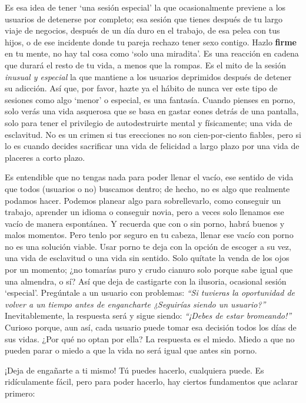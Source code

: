 \documentclass[
]{book}
\begin{document}
Es esa idea de tener `una sesión especial' la que ocasionalmente previene a los usuarios de detenerse por completo; esa sesión que tienes después de tu largo viaje de negocios, después de un día duro en el trabajo, de esa pelea con tus hijos, o de ese incidente donde tu pareja rechazo tener sexo contigo. Hazlo \textbf{firme} en tu mente, no hay tal cosa como `solo una miradita'. Es una reacción en cadena que durará el resto de tu vida, a menos que la rompas. Es el mito de la sesión \emph{inusual y especial} la que mantiene a los usuarios deprimidos después de detener su adicción. Así que, por favor, hazte ya el hábito de nunca ver este tipo de sesiones como algo `menor' o especial, es una fantasía. Cuando pienses en porno, solo verás una vida asquerosa que se basa en gastar eones detrás de una pantalla, solo para tener el privilegio de autodestruirte mental y físicamente; una vida de esclavitud. No es un crimen si tus erecciones no son cien-por-ciento fiables, pero si lo es cuando decides sacrificar una vida de felicidad a largo plazo por una vida de placeres a corto plazo.

Es entendible que no tengas nada para poder llenar el vacío, ese sentido de vida que todos (usuarios o no) buscamos dentro; de hecho, no es algo que realmente podamos hacer. Podemos planear algo para sobrellevarlo, como conseguir un trabajo, aprender un idioma o conseguir novia, pero a veces solo llenamos ese vacío de manera espontánea. Y recuerda que con o sin porno, habrá buenos y malos momentos. Pero tenlo por seguro en tu cabeza, llenar ese vacío con porno no es una solución viable. Usar porno te deja con la opción de escoger a su vez, una vida de esclavitud o una vida sin sentido. Solo quítate la venda de los ojos por un momento; ¿no tomarías puro y crudo cianuro solo porque sabe igual que una almendra, o sí? Así que deja de castigarte con la ilusoria, ocasional sesión `especial'. Pregúntale a un usuario con problemas: \emph{``Si tuvieras la oportunidad de volver a un tiempo antes de engancharte ¿Seguirías siendo un usuario?''} Inevitablemente, la respuesta será y sigue siendo: \emph{``¡Debes de estar bromeando!''} Curioso porque, aun así, cada usuario puede tomar esa decisión todos los días de sus vidas. ¿Por qué no optan por ella? La respuesta es el miedo. Miedo a que no pueden parar o miedo a que la vida no será igual que antes sin porno.

¡Deja de engañarte a ti mismo! Tú puedes hacerlo, cualquiera puede. Es ridículamente fácil, pero para poder hacerlo, hay ciertos fundamentos que aclarar primero:
\end{document}
